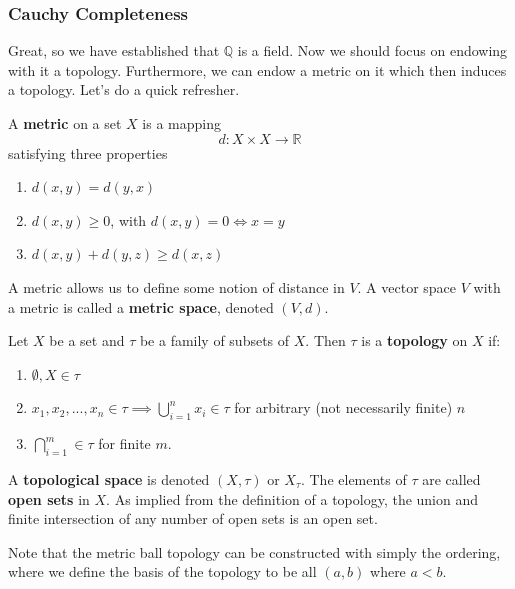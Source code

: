 \documentclass{article}
\begin{document}
    \subsubsection{Cauchy Completeness} 

      Great, so we have established that $\mathbb{Q}$ is a field. Now we should focus on endowing with it a topology. Furthermore, we can endow a metric on it which then induces a topology. Let's do a quick refresher. 

      \begin{definition}[Metric]
        A \textbf{metric} on a set $X$ is a mapping
        \begin{equation}
          d: X \times X \longrightarrow \mathbb{R}
        \end{equation}
        satisfying three properties 
        \begin{enumerate}
          \item $d(x, y) = d(y, x)$
          \item $d(x, y) \geq 0$, with $d(x,y) = 0 \iff x=y$
          \item $d(x, y) + d(y,z) \geq d(x,z)$
        \end{enumerate}
        A metric allows us to define some notion of distance in $V$. A vector space $V$ with a metric is called a \textbf{metric space}, denoted $(V, d)$. 
      \end{definition}

      \begin{definition}[Topology]
        Let $X$ be a set and $\tau$ be a family of subsets of $X$. Then $\tau$ is a \textbf{topology} on $X$ if: 
        \begin{enumerate}
          \item $\emptyset, X \in \tau$
          \item $x_1, x_2, ..., x_n \in \tau \implies \bigcup_{i = 1}^{n} x_{i} \in \tau$ for arbitrary (not necessarily finite) $n$
          \item $\bigcap_{i=1}^{m} \in \tau$ for finite $m$. 
        \end{enumerate}
        A \textbf{topological space} is denoted $(X, \tau)$ or $X_{\tau}$. The elements of $\tau$ are called \textbf{open sets} in $X$. As implied from the definition of a topology, the union and finite intersection of any number of open sets is an open set. 
      \end{definition}

      \begin{definition}
        Note that the metric ball topology can be constructed with simply the ordering, where we define the basis of the topology to be all $(a, b)$ where $a < b$. 
      \end{definition}
\end{document}
